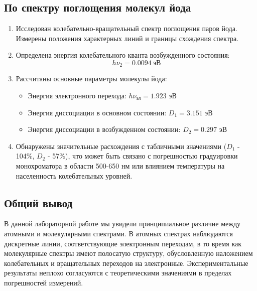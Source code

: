 \documentclass[a4paper,12pt]{article}
\begin{document}
\subsection{По спектру поглощения молекул йода}

\begin{enumerate}
    \item Исследован колебательно-вращательный спектр поглощения паров йода. Измерены положения характерных линий и границы схождения спектра.

    \item Определена энергия колебательного кванта возбужденного состояния: 
    \[
    h\nu_2 = 0.0094\ \text{эВ}
    \]

    \item Рассчитаны основные параметры молекулы йода:
    \begin{itemize}
        \item Энергия электронного перехода: $h\nu_{\text{эл}} = 1.923$ эВ
        \item Энергия диссоциации в основном состоянии: $D_1 = 3.151$ эВ
        \item Энергия диссоциации в возбужденном состоянии: $D_2 = 0.297$ эВ
    \end{itemize}

    \item Обнаружены значительные расхождения с табличными значениями ($D_1$ - 104\%, $D_2$ - 57\%), что может быть связано с погрешностью градуировки монохроматора в области 500-650 нм или влиянием температуры на населенность колебательных уровней.
\end{enumerate}

\subsection{Общий вывод}

В данной лабораторной работе мы увидели принципиальное различие между атомными и молекулярными спектрами. В атомных спектрах наблюдаются дискретные линии, соответствующие электронным переходам, в то время как молекулярные спектры имеют полосатую структуру, обусловленную наложением колебательных и вращательных переходов на электронные. Экспериментальные результаты неплохо согласуются с теоретическими значениями в пределах погрешностей измерений.
\end{document}
